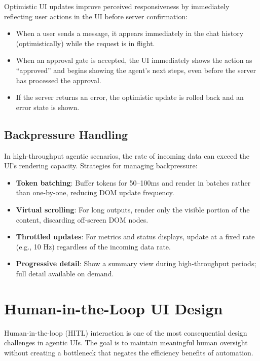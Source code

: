 Optimistic UI updates improve perceived responsiveness by immediately reflecting user actions in the UI before server confirmation:

\begin{itemize}
  \item When a user sends a message, it appears immediately in the chat history (optimistically) while the request is in flight.
  \item When an approval gate is accepted, the UI immediately shows the action as ``approved'' and begins showing the agent’s next steps, even before the server has processed the approval.
  \item If the server returns an error, the optimistic update is rolled back and an error state is shown.
\end{itemize}

\subsection{Backpressure Handling}
\label{backpressure-handling}

In high-throughput agentic scenarios, the rate of incoming data can exceed the UI’s rendering capacity. Strategies for managing backpressure:

\begin{itemize}
  \item \textbf{Token batching}: Buffer tokens for 50--100ms and render in batches rather than one-by-one, reducing DOM update frequency.
  \item \textbf{Virtual scrolling}: For long outputs, render only the visible portion of the content, discarding off-screen DOM nodes.
  \item \textbf{Throttled updates}: For metrics and status displays, update at a fixed rate (e.g., 10 Hz) regardless of the incoming data rate.
  \item \textbf{Progressive detail}: Show a summary view during high-throughput periods; full detail available on demand.
\end{itemize}

\section{Human-in-the-Loop UI Design}
\label{subsec:hitl-design}

Human-in-the-loop (HITL) interaction is one of the most consequential design challenges in agentic UIs. The goal is to maintain meaningful human oversight without creating a bottleneck that negates the efficiency benefits of automation.

